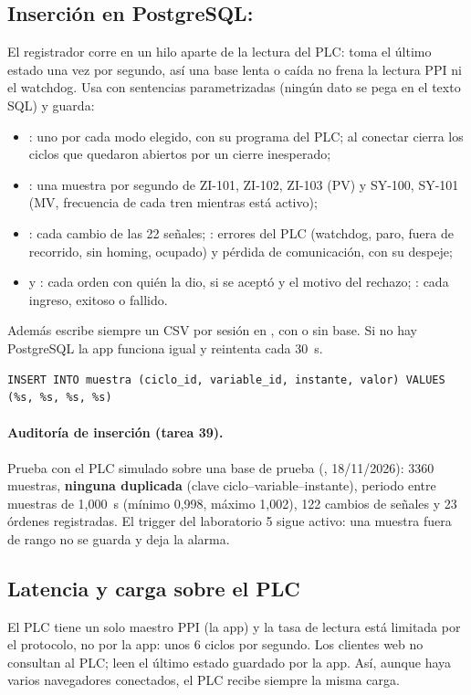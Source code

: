 \documentclass[a4paper,11pt]{article}
\begin{document}
\subsection{Inserción en PostgreSQL: }
El registrador corre en un hilo aparte de la lectura del PLC: toma el último estado una vez por segundo, así una base lenta o caída no frena la lectura PPI ni el watchdog. Usa  con sentencias parametrizadas (ningún dato se pega en el texto SQL) y guarda:
\begin{itemize}
\item {}: uno por cada modo elegido, con su programa del PLC; al conectar cierra los ciclos que quedaron abiertos por un cierre inesperado;
\item {}: una muestra por segundo de ZI-101, ZI-102, ZI-103 (PV) y SY-100, SY-101 (MV, frecuencia de cada tren mientras está activo);
\item {}: cada cambio de las 22 señales; : errores del PLC (watchdog, paro, fuera de recorrido, sin homing, ocupado) y pérdida de comunicación, con su despeje;
\item {} y : cada orden con quién la dio, si se aceptó y el motivo del rechazo; : cada ingreso, exitoso o fallido.
\end{itemize}
Además escribe siempre un CSV por sesión en , con o sin base. Si no hay PostgreSQL la app funciona igual y reintenta cada 30~s.
\begin{lstlisting}[style=sql]
INSERT INTO muestra (ciclo_id, variable_id, instante, valor) VALUES (%s, %s, %s, %s)
\end{lstlisting}

\paragraph{Auditoría de inserción (tarea 39).} Prueba con el PLC simulado sobre una base de prueba (, 18/11/2026): 3360 muestras, \textbf{ninguna duplicada} (clave ciclo--variable--instante), periodo entre muestras de 1,000~s (mínimo 0,998, máximo 1,002), 122 cambios de señales y 23 órdenes registradas. El trigger del laboratorio 5 sigue activo: una muestra fuera de rango no se guarda y deja la alarma.

\subsection{Latencia y carga sobre el PLC}
El PLC tiene un solo maestro PPI (la app) y la tasa de lectura está limitada por el protocolo, no por la app: unos 6 ciclos por segundo. Los clientes web no consultan al PLC; leen el último estado guardado por la app. Así, aunque haya varios navegadores conectados, el PLC recibe siempre la misma carga.
\end{document}

